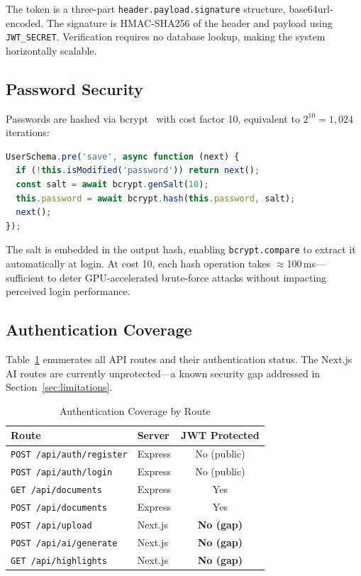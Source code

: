 \documentclass[conference]{IEEEtran}
\begin{document}
The token is a three-part \texttt{header.payload.signature} structure, base64url-encoded. The signature is HMAC-SHA256 of the header and payload using \texttt{JWT\_SECRET}. Verification requires no database lookup, making the system horizontally scalable.

\subsection{Password Security}

Passwords are hashed via bcrypt~\cite{bcrypt1999} with cost factor 10, equivalent to $2^{10} = 1{,}024$ iterations:

\begin{lstlisting}[language=JavaScript, caption={Mongoose pre-save bcrypt hook}]
UserSchema.pre('save', async function (next) {
  if (!this.isModified('password')) return next();
  const salt = await bcrypt.genSalt(10);
  this.password = await bcrypt.hash(this.password, salt);
  next();
});
\end{lstlisting}

The salt is embedded in the output hash, enabling \texttt{bcrypt.compare} to extract it automatically at login. At cost 10, each hash operation takes $\approx$100\,ms---sufficient to deter GPU-accelerated brute-force attacks without impacting perceived login performance.

\subsection{Authentication Coverage}

Table~\ref{tab:security} enumerates all API routes and their authentication status. The Next.js AI routes are currently unprotected---a known security gap addressed in Section~\ref{sec:limitations}.

\begin{table}[H]
\centering
\caption{Authentication Coverage by Route}
\label{tab:security}
\renewcommand{\arraystretch}{1.2}
\begin{tabular}{@{}llc@{}}
\toprule
\textbf{Route} & \textbf{Server} & \textbf{JWT Protected} \\
\midrule
\texttt{POST /api/auth/register} & Express & No (public) \\
\texttt{POST /api/auth/login} & Express & No (public) \\
\texttt{GET /api/documents} & Express & Yes \\
\texttt{POST /api/documents} & Express & Yes \\
\texttt{POST /api/upload} & Next.js & \textbf{No (gap)} \\
\texttt{POST /api/ai/generate} & Next.js & \textbf{No (gap)} \\
\texttt{GET /api/highlights} & Next.js & \textbf{No (gap)} \\
\bottomrule
\end{tabular}
\end{table}
\end{document}
